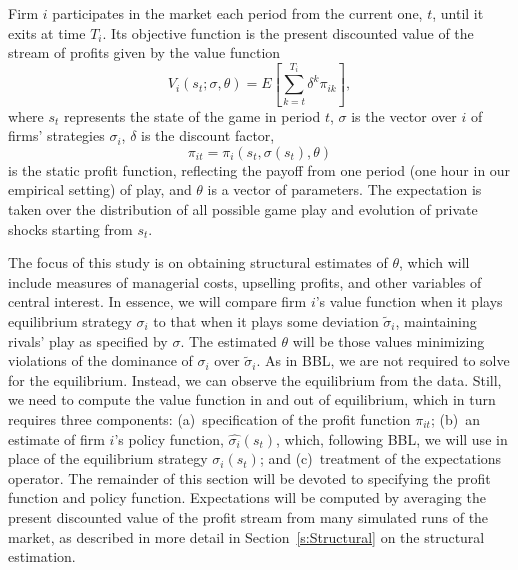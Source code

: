 \documentclass[11pt]{article}
\begin{document}
\begin{spacing}{1.3}
Firm $i$ participates in the market each period from the current one,
$t$, until it exits at time $T_i$. Its objective function is the
present discounted value of the stream of profits given by the value
function
\begin{equation}
\label{disprofit}
V_i(s_t; \sigma, \theta) = E \left[ \sum_{k=t}^{T_i} \delta^k \pi_{ik}
  \right],
\end{equation}
where $s_t$ represents the state of the game in period $t$, $\sigma$
is the vector over $i$ of firms' strategies $\sigma_i$, $\delta$ is
the discount factor,
\begin{equation}
\label{pi}
\pi_{it} = \pi_i(s_t, \sigma(s_t), \theta)
\end{equation}
is the static profit function, reflecting the payoff from one period
(one hour in our empirical setting) of play, and $\theta$ is a vector
of parameters. The expectation is taken over the distribution of all
possible game play and evolution of private shocks starting from
$s_t$.

The focus of this study is on obtaining structural estimates of
$\theta$, which will include measures of managerial costs, upselling
profits, and other variables of central interest. In essence, we will
compare firm $i$'s value function when it plays equilibrium strategy
$\sigma_i$ to that when it plays some deviation $\tilde{\sigma}_i$,
maintaining rivals' play as specified by $\sigma$.  The estimated
$\theta$ will be those values minimizing violations of the dominance
of $\sigma_i$ over $\tilde{\sigma}_i$. As in BBL, we are not required
to solve for the equilibrium.  Instead, we can observe the equilibrium
from the data. Still, we need to compute the value function in and out
of equilibrium, which in turn requires three components:
(a)~specification of the profit function $\pi_{it}$; (b)~an estimate
of firm $i$'s policy function, $\hat{\sigma_i}(s_t)$, which, following
BBL, we will use in place of the equilibrium strategy $\sigma_i(s_t)$;
and (c)~treatment of the expectations operator. The remainder of this
section will be devoted to specifying the profit function and policy
function. Expectations will be computed by averaging the present
discounted value of the profit stream from many simulated runs of the
market, as described in more detail in Section~\ref{s:Structural} on
the structural estimation.


\end{spacing}
\end{document}
